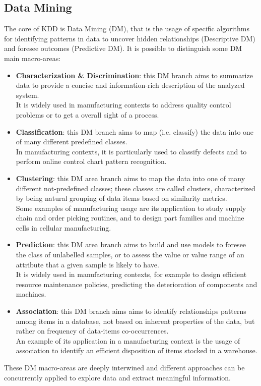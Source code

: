 \subsection{Data Mining}
\label{Data Mining}
The core of KDD is Data Mining (DM), that is the usage of specific algorithms for identifying patterns in data to uncover hidden relationships (Descriptive DM) and foresee outcomes (Predictive DM). It is possible to distinguish some DM main macro-areas:
\begin{itemize}
\item \textbf{Characterization \& Discrimination}: this DM branch aims to summarize data to provide a concise and information-rich description of the analyzed system. \\It is widely used in manufacturing contexts to address quality control problems or to get a overall sight of a process.
\item \textbf{Classification}: this DM branch aims to map (i.e. classify) the data into one of many different predefined classes. \\In manufacturing contexts, it is particularly used to classify defects and to perform online control chart pattern recognition.
\item \textbf{Clustering}: this DM area branch aims to map the data into one of many different not-predefined classes; these classes are called clusters, characterized by being natural grouping of data items based on similarity metrics. \\Some examples of manufacturing usage are its application to study supply chain and order picking routines, and to design part families and machine cells in cellular manufacturing.
\item \textbf{Prediction}: this DM area branch aims to build and use models to foresee the class of unlabelled samples, or to assess the value or value range of an attribute that a given sample is likely to have. \\It is widely used in manufacturing contexts, for example to design efficient resource maintenance policies, predicting the deterioration of components and machines.
\item \textbf{Association}: this DM branch aims aims to identify relationships patterns among items in a database, not based on inherent properties of the data, but rather on frequency of data-items co-occurrences. \\An example of its application in a manufacturing context is the usage of association to identify an efficient disposition of items stocked in a warehouse.
\end{itemize}
These DM macro-areas are deeply interwined and different approaches can be concurrently applied to explore data and extract meaningful information. \\
